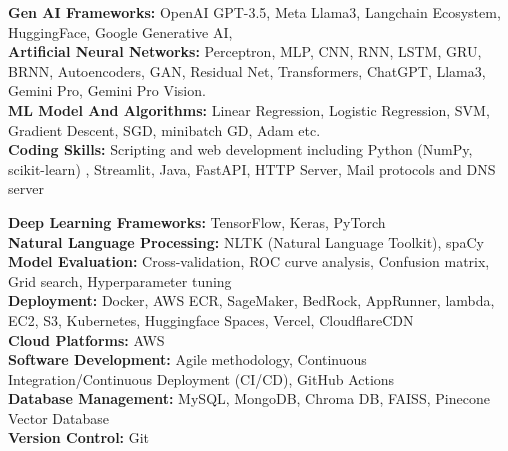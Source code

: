 \documentclass[letterpaper,11pt]{article}
\begin{document}
\begin{itemize}[leftmargin=0.15in, label={}]
    \small{
    \item{
        
        \textbf{Gen AI Frameworks:} OpenAI GPT-3.5, Meta Llama3, Langchain Ecosystem, HuggingFace, Google Generative AI, \\
        \vspace{0.15cm}
        \textbf{Artificial Neural Networks:} Perceptron, MLP, CNN, RNN, LSTM, GRU, BRNN, Autoencoders, GAN, Residual Net, Transformers, ChatGPT, Llama3, Gemini Pro, Gemini Pro Vision.  \\
        \vspace{0.15cm}
        \textbf{ML Model And Algorithms:} Linear Regression, Logistic Regression, SVM, Gradient Descent, SGD, minibatch GD, Adam etc. \\
        \vspace{0.15cm}
        \textbf{Coding Skills:} Scripting and web development including Python (NumPy, scikit-learn) , Streamlit, Java, FastAPI, HTTP Server, Mail protocols and DNS server \\
        \vspace{0.15cm}

        \textbf{Deep Learning Frameworks:} TensorFlow, Keras, PyTorch \\
        \vspace{0.15cm}
        \textbf{Natural Language Processing:} NLTK (Natural Language Toolkit), spaCy \\
        \vspace{0.15cm}
        \textbf{Model Evaluation:} Cross-validation, ROC curve analysis, Confusion matrix, Grid search, Hyperparameter tuning \\
        \vspace{0.15cm}
        \textbf{Deployment:} Docker, AWS ECR, SageMaker, BedRock, AppRunner, lambda, EC2, S3, Kubernetes, Huggingface Spaces, Vercel, CloudflareCDN \\
        \vspace{0.15cm}
        \textbf{Cloud Platforms:} AWS  \\
        \vspace{0.15cm}
        \textbf{Software Development:} Agile methodology, Continuous Integration/Continuous Deployment (CI/CD), GitHub Actions \\
        \vspace{0.15cm}
        \textbf{Database Management:} MySQL, MongoDB, Chroma DB, FAISS, Pinecone Vector Database \\
        \vspace{0.15cm}
        \textbf{Version Control:} Git \\
        \vspace{0.15cm}
    }
    }
\end{itemize}
\end{document}
